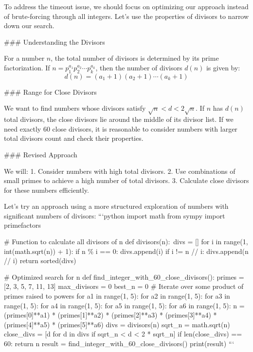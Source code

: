 \begingroup\raggedleft
\begin{gpt}{\gptheader}
    To address the timeout issue, we should focus on optimizing our approach instead of brute-forcing through all integers. Let's use the properties of divisors to narrow down our search.

    ### Understanding the Divisors
    
    For a number $ n $, the total number of divisors is determined by its prime factorization. If $ n = p_1^{a_1} p_2^{a_2} \cdots p_k^{a_k} $, then the number of divisors $ d(n) $ is given by:
    $$ d(n) = (a_1 + 1)(a_2 + 1) \cdots (a_k + 1) $$
    
    ### Range for Close Divisors
    
    We want to find numbers whose divisors satisfy $ \sqrt{n} < d < 2\sqrt{n} $. If $ n $ has $ d(n) $ total divisors, the close divisors lie around the middle of its divisor list. If we need exactly 60 close divisors, it is reasonable to consider numbers with larger total divisors count and check their properties.
    
    ### Revised Approach
    
    We will:
        1. Consider numbers with high total divisors.
        2. Use combinations of small primes to achieve a high number of total divisors.
        3. Calculate close divisors for these numbers efficiently.
        
    Let's try an approach using a more structured exploration of numbers with significant numbers of divisors:
    ```python
    import math
    from sympy import primefactors 
    
    # Function to calculate all divisors of n
    def divisors(n):\
       divs = []
       for i in range(1, int(math.sqrt(n)) + 1):
            if n \% i == 0:
                divs.append(i)
                if i != n // i:
                    divs.append(n // i)
        return sorted(divs)
        
    # Optimized search for n
    def find_integer_with_60_close_divisors():
        primes = [2, 3, 5, 7, 11, 13]
        max_divisors = 0    
        best_n = 0    
        # Iterate over some product of primes raised to powers    
        for a1 in range(1, 5):        
            for a2 in range(1, 5):
                for a3 in range(1, 5):
                    for a4 in range(1, 5):                    
                        for a5 in range(1, 5):                        
                            for a6 in range(1, 5):                            
                                n = (primes[0]**a1) * (primes[1]**a2) * (primes[2]**a3) * (primes[3]**a4) * (primes[4]**a5) * (primes[5]**a6)                            
                                divs = divisors(n)                            
                                sqrt_n = math.sqrt(n)                            
                                close_divs = [d for d in divs if sqrt_n < d < 2 * sqrt_n]                           
                                if len(close_divs) == 60:                               
                                    return n
    result = find_integer_with_60_close_divisors()
    print(result)
    ```
    

\end{gpt}
